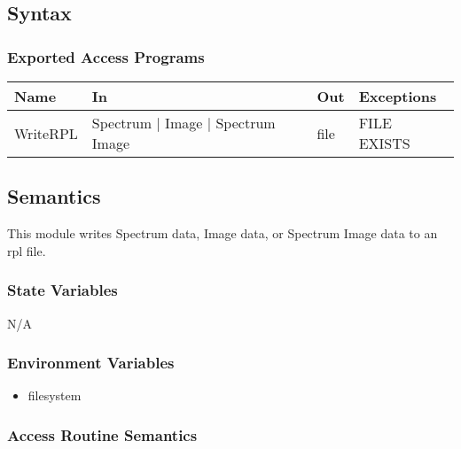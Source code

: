 \documentclass[12pt, titlepage]{article}
\begin{document}
\subsection{Syntax}

\subsubsection{Exported Access Programs}

\begin{center}
    \begin{tabular}{p{2cm} p{4cm} p{4cm} p{4cm}}
        \hline
        \textbf{Name} & \textbf{In} & \textbf{Out} & \textbf{Exceptions} \\
        \hline
        WriteRPL & Spectrum $|$ Image $|$ Spectrum Image & file & FILE EXISTS \\
        \hline
    \end{tabular}
\end{center}

\subsection{Semantics}
This module writes Spectrum data, Image data, or Spectrum Image data to an rpl
file.

\subsubsection{State Variables}
N/A

\subsubsection{Environment Variables}
\begin{itemize}
    \item filesystem
\end{itemize}

\subsubsection{Access Routine Semantics}
\end{document}
